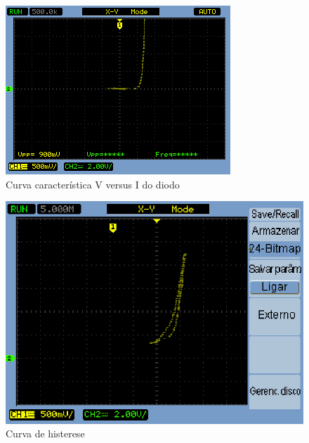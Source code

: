 \documentclass[a4paper]{article} %
\begin{document}
\begin{figure}[h!]
\begin{centering}
\includegraphics[scale=0.7]{Imagens/3.1/NewFile0} \caption{Curva característica V versus I do diodo  \label{fig:q1-curva2}}
\par\end{centering}
\end{figure}


\begin{figure}[h!]
\begin{centering}
\includegraphics[scale=1.0]{Imagens/3.1.opcional/opcio} \caption{Curva de histerese \label{fig:q1-his}}
\par\end{centering}
\end{figure}
\end{document}
